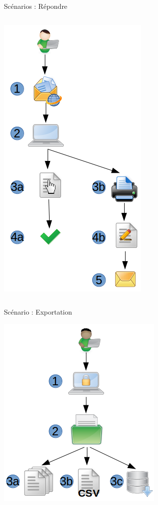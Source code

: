 \documentclass[11pt]{beamer}
\begin{document}
\begin{frame}{Scénarios : Répondre}
\begin{columns}[t]
\begin{column}[T]{.5\textwidth}
\begin{center}
  		\includegraphics[width=.25\paperwidth]{images/scenario_fill_anonyme.png}
  		\end{center}
	\end{column}
\end{columns}
\end{frame}

\begin{frame}{Scénario : Exportation}
\begin{center}
\includegraphics[width=.45\paperwidth]{images/scenario_exportation.png}
\end{center}
\end{frame}
\end{document}
